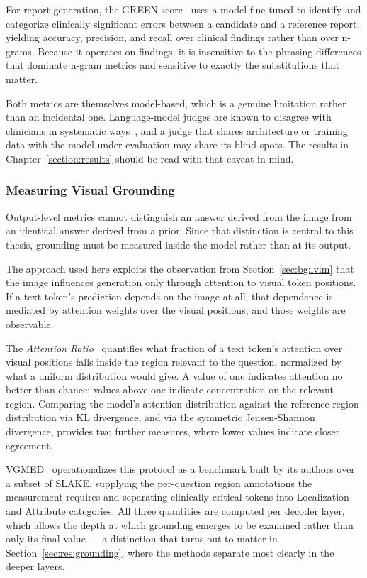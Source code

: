 For report generation, the GREEN score~\cite{ostmeier2024green} uses a model fine-tuned to identify and categorize clinically significant errors between a candidate and a reference report, yielding accuracy, precision, and recall over clinical findings rather than over n-grams. Because it operates on findings, it is insensitive to the phrasing differences that dominate n-gram metrics and sensitive to exactly the substitutions that matter.

Both metrics are themselves model-based, which is a genuine limitation rather than an incidental one. Language-model judges are known to disagree with clinicians in systematic ways~\cite{delucia2026same}, and a judge that shares architecture or training data with the model under evaluation may share its blind spots. The results in Chapter~\ref{section:results} should be read with that caveat in mind.

\subsubsection{Measuring Visual Grounding}

Output-level metrics cannot distinguish an answer derived from the image from an identical answer derived from a prior. Since that distinction is central to this thesis, grounding must be measured inside the model rather than at its output.

The approach used here exploits the observation from Section~\ref{sec:bg:lvlm} that the image influences generation only through attention to visual token positions. If a text token's prediction depends on the image at all, that dependence is mediated by attention weights over the visual positions, and those weights are observable.

The \emph{Attention Ratio}~\cite{khayatkhoei2025mllms} quantifies what fraction of a text token's attention over visual positions falls inside the region relevant to the question, normalized by what a uniform distribution would give. A value of one indicates attention no better than chance; values above one indicate concentration on the relevant region. Comparing the model's attention distribution against the reference region distribution via KL divergence, and via the symmetric Jensen-Shannon divergence, provides two further measures, where lower values indicate closer agreement.

VGMED~\cite{liu2026vgmed} operationalizes this protocol as a benchmark built by its authors over a subset of SLAKE, supplying the per-question region annotations the measurement requires and separating clinically critical tokens into Localization and Attribute categories. All three quantities are computed per decoder layer, which allows the depth at which grounding emerges to be examined rather than only its final value --- a distinction that turns out to matter in Section~\ref{sec:res:grounding}, where the methods separate most clearly in the deeper layers.
